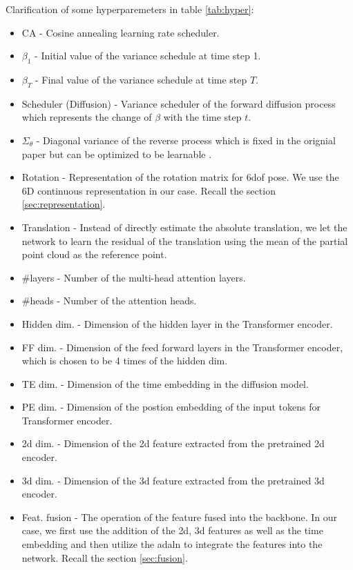 \documentclass[12pt,DIV14,BCOR12mm,a4paper,footinclude=false,headinclude,parskip=half-,twoside,openright,cleardoublepage=empty,toc=index,bibliography=totoc,listof=totoc]{scrreprt}
\numberwithin{equation}{chapter}
\begin{document}
Clarification of some hyperparemeters in table \ref{tab:hyper}:
\begin{itemize}
  \item CA - Cosine annealing learning rate scheduler.
  \item $\beta_{1}$ - Initial value of the variance schedule at time step 1.
  \item $\beta_{T}$ - Final value of the variance schedule at time step $T$.
  \item Scheduler (Diffusion) - Variance scheduler of the forward diffusion process which represents the change of $\beta$ with the time step $t$.
  \item $\Sigma_{\theta}$ - Diagonal variance of the reverse process which is fixed in the orignial paper \cite{ho2020denoising} but can be optimized to be learnable \cite{nichol2021improved}.
  \item Rotation - Representation of the rotation matrix for \gls{6dof} pose. We use the 6D continuous representation in our case. Recall the section \ref{sec:representation}.
  \item Translation - Instead of directly estimate the absolute translation, we let the network to learn the residual of the translation using the mean of the partial point cloud as the reference point.
  \item \#layers - Number of the multi-head attention layers.
  \item \#heads - Number of the attention heads.
  \item Hidden dim. - Dimension of the hidden layer in the Transformer encoder.
  \item FF dim. - Dimension of the feed forward layers in the Transformer encoder, which is chosen to be 4 times of the hidden dim.
  \item TE dim. - Dimension of the time embedding in the diffusion model.
  \item PE dim. - Dimension of the postion embedding of the input tokens for Transformer encoder.
  \item \gls{2d} dim. - Dimension of the \gls{2d} feature extracted from the pretrained \gls{2d} encoder.
  \item \gls{3d} dim. - Dimension of the \gls{3d} feature extracted from the pretrained \gls{3d} encoder.
  \item Feat. fusion - The operation of the feature fused into the backbone. In our case, we first use the addition of the \gls{2d}, \gls{3d} features as well as the time embedding and then utilize the \gls{adaln} to integrate the features into the network. Recall the section \ref{sec:fusion}.
\end{itemize}
\end{document}
